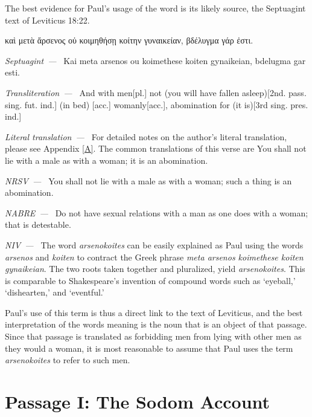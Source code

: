 \documentclass[10pt]{article}
\let\oldquote\quote
\let\endoldquote\endquote
\renewenvironment{quote}[2][]
  {\if\relax\detokenize{#1}\relax
     \def\quoteauthor{#2}%
   \else
     \def\quoteauthor{#2~---~#1}%
   \fi
   \oldquote}
  {\par\nobreak\smallskip\hfill\textit{\quoteauthor}%
   \endoldquote\addvspace{\bigskipamount}}
\begin{document}
The best evidence for Paul's usage of the word is its likely source, the Septuagint text of Leviticus 18:22.

\begin{quote}{Septuagint}
καὶ μετὰ ἄρσενος οὐ κοιμηθήσῃ κοίτην γυναικείαν, βδέλυγμα γάρ ἐστι. 
\end{quote}
\begin{quote}{Transliteration}
Kai meta arsenos ou koimethese koiten gynaikeian, bdelugma gar esti.
\end{quote}
\begin{quote}{Literal translation}
And with men[pl.] not (you will have fallen asleep)[2nd. pass. sing. fut. ind.] (in bed) [acc.] womanly[acc.], abomination for (it is)[3rd sing. pres. ind.]
\end{quote}
For detailed notes on the author's literal translation, please see Appendix \ref{A}. The common translations of this verse are
\begin{quote}{NRSV}
You shall not lie with a male as with a woman; it is an abomination.
\end{quote}
\begin{quote}{NABRE}
You shall not lie with a male as with a woman; such a thing is an abomination.
\end{quote}
\begin{quote}{NIV}
Do not have sexual relations with a man as one does with a woman; that is detestable.
\end{quote}
\pagebreak
The word \textit{arsenokoites} can be easily explained as Paul using the words \textit{arsenos}  and \textit{koiten} to contract the Greek phrase \textit{meta arsenos koimethese koiten gynaikeian}. The two roots taken together and pluralized, yield \textit{arsenokoites}. This is comparable to Shakespeare's invention of compound words such as `eyeball,' `dishearten,' and `eventful.'

Paul's use of this term is thus a direct link to the text of Leviticus, and the best interpretation of the words meaning is the noun that is an object of that passage. Since that passage is translated as forbidding men from lying with other men as they would a woman, it is most reasonable to assume that Paul uses the term \textit{arsenokoites} to refer to such men. 

\section*{Passage I: The Sodom Account}


\appendix
\end{document}
